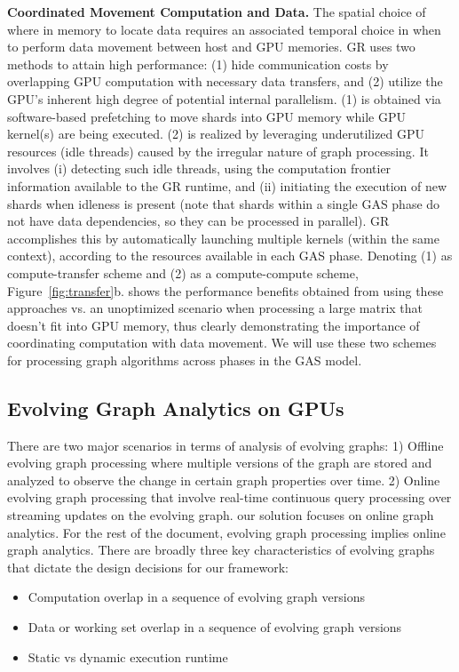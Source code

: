 \textbf{Coordinated Movement Computation and Data.}
The spatial choice of where in memory to locate data requires an associated temporal choice in when to perform data movement between host and GPU memories. GR uses two methods to attain high performance: (1) hide communication costs by overlapping GPU computation with necessary data transfers, and (2) utilize the GPU’s inherent high degree of potential internal parallelism. (1) is obtained via software-based prefetching to move shards into GPU memory while GPU kernel(s) are being executed. (2) is realized by leveraging underutilized GPU resources (idle threads) caused by the irregular nature of graph processing. It involves (i) detecting such idle threads, using the computation frontier information available to the GR runtime, and (ii) initiating the execution of new shards when idleness is present (note that shards within a single GAS phase do not have data dependencies, so they can be processed in parallel). GR accomplishes this by automatically launching multiple kernels (within the same context), according to the resources available in each GAS phase. Denoting (1) as compute-transfer scheme and (2) as a compute-compute scheme, Figure~\ref{fig:transfer}b. shows the performance benefits obtained from using these approaches vs. an unoptimized scenario when processing a large matrix that doesn’t fit into GPU memory, thus clearly demonstrating the importance of coordinating computation with data movement. We will use these two schemes for processing graph algorithms across phases in the GAS model.

\subsection{Evolving Graph Analytics on GPUs}
There are two major scenarios in terms of analysis of evolving graphs: 1) Offline evolving graph processing where multiple versions of the graph are stored and analyzed to observe the change in certain graph properties over time. 2) Online evolving graph processing that involve real-time continuous query processing over streaming updates on the evolving graph. our solution focuses on online graph analytics. For the rest of the document, evolving graph processing implies online graph analytics.
There are broadly three key characteristics of evolving graphs that dictate the design decisions for our framework:
\begin{itemize}
\item Computation overlap in a sequence of evolving graph versions
\item Data or working set overlap in a sequence of evolving graph versions
\item Static vs dynamic execution runtime
\end{itemize}

